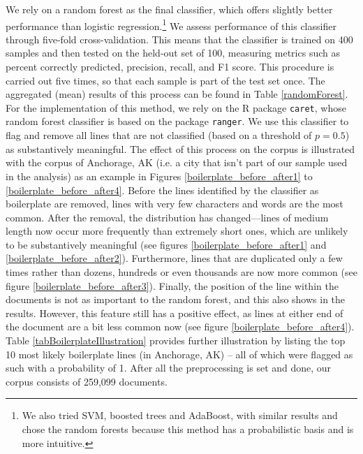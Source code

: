 \documentclass[11pt]{article}
\begin{document}

%

%

We rely on a random forest as the final classifier, which offers slightly better performance than logistic regression.\footnote{We also tried SVM, boosted trees and AdaBoost, with similar results and chose the random forests because this method has a probabilistic basis and is more intuitive.} We assess performance of this classifier through five-fold cross-validation. This means that the classifier is trained on 400 samples and then tested on the held-out set of 100, measuring metrics such as percent correctly predicted, precision, recall, and F1 score. This procedure is carried out five times, so that each sample is part of the test set once. The aggregated (mean) results of this process can be found in Table \ref{randomForest}. For the implementation of this method, we rely on the R package \texttt{caret}, whose random forest classifier is based on the package \texttt{ranger}. We use this classifier to flag and remove all lines that are not classified (based on a threshold of $p = 0.5$) as substantively meaningful. The effect of this process on the corpus is illustrated with the corpus of Anchorage, AK (i.e. a city that isn't part of our sample used in the analysis) as an example in Figures \ref{boilerplate_before_after1} to \ref{boilerplate_before_after4}. Before the lines identified by the classifier as boilerplate are removed, lines with very few characters and words are the most common. After the removal, the distribution has changed---lines of medium length now occur more frequently than extremely short ones, which are unlikely to be substantively meaningful (see figures \ref{boilerplate_before_after1} and \ref{boilerplate_before_after2}). Furthermore, lines that are duplicated only a few times rather than dozens, hundreds or even thousands are now more common (see figure \ref{boilerplate_before_after3}). Finally, the position of the line within the documents is not as important to the random forest, and this also shows in the results. However, this feature still has a positive effect, as lines at either end of the document are a bit less common now (see figure \ref{boilerplate_before_after4}). Table \ref{tabBoilerplateIllustration} provides further illustration by listing the top 10 most likely boilerplate lines (in Anchorage, AK) -- all of which were flagged as such with a probability of 1. After all the preprocessing is set and done, our corpus consists of 259,099 documents.
\end{document}
